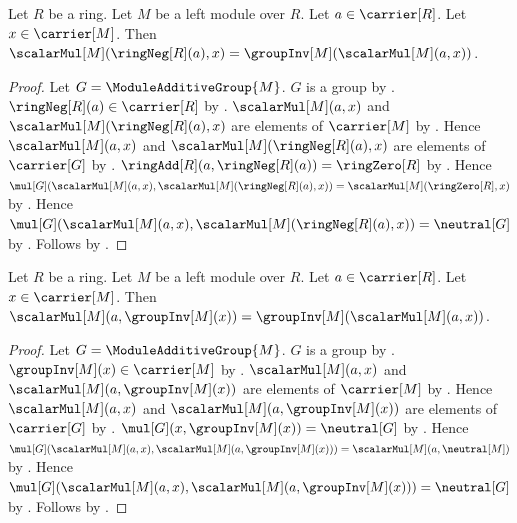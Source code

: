 \begin{theorem}\label{module_scalar_negation}
    Let $R$ be a ring.
    Let $M$ be a left module over $R$.
    Let $a\in\carrier[R]$.
    Let $x\in\carrier[M]$.
    Then
        $\scalarMul[M](\ringNeg[R](a),x)
            =\groupInv[M](\scalarMul[M](a,x))$.
\end{theorem}
\begin{proof}
    Let $G=\ModuleAdditiveGroup{M}$.
    $G$ is a group by .
    $\ringNeg[R](a)\in\carrier[R]$ by .
    $\scalarMul[M](a,x)$ and
        $\scalarMul[M](\ringNeg[R](a),x)$ are elements of $\carrier[M]$
        by .
    Hence $\scalarMul[M](a,x)$ and
        $\scalarMul[M](\ringNeg[R](a),x)$ are elements of $\carrier[G]$
        by .
    $\ringAdd[R](a,\ringNeg[R](a))=\ringZero[R]$
        by .
    Hence
        $\mul[G](\scalarMul[M](a,x),
            \scalarMul[M](\ringNeg[R](a),x))
        =\scalarMul[M](\ringZero[R],x)$ by
        .
    Hence
        $\mul[G](\scalarMul[M](a,x),
            \scalarMul[M](\ringNeg[R](a),x))=\neutral[G]$ by
        .
    Follows by
        .
\end{proof}

\begin{theorem}\label{module_vector_negation_scalar}
    Let $R$ be a ring.
    Let $M$ be a left module over $R$.
    Let $a\in\carrier[R]$.
    Let $x\in\carrier[M]$.
    Then
        $\scalarMul[M](a,\groupInv[M](x))
            =\groupInv[M](\scalarMul[M](a,x))$.
\end{theorem}
\begin{proof}
    Let $G=\ModuleAdditiveGroup{M}$.
    $G$ is a group by .
    $\groupInv[M](x)\in\carrier[M]$ by
        .
    $\scalarMul[M](a,x)$ and
        $\scalarMul[M](a,\groupInv[M](x))$ are elements of $\carrier[M]$
        by .
    Hence $\scalarMul[M](a,x)$ and
        $\scalarMul[M](a,\groupInv[M](x))$ are elements of $\carrier[G]$
        by .
    $\mul[G](x,\groupInv[M](x))=\neutral[G]$ by
        .
    Hence
        $\mul[G](\scalarMul[M](a,x),
            \scalarMul[M](a,\groupInv[M](x)))
        =\scalarMul[M](a,\neutral[M])$ by
        .
    Hence
        $\mul[G](\scalarMul[M](a,x),
            \scalarMul[M](a,\groupInv[M](x)))=\neutral[G]$ by
        .
    Follows by
        .
\end{proof}

